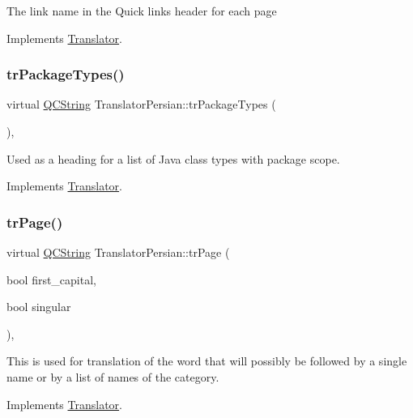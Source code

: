 The link name in the Quick links header for each page 

Implements \mbox{\hyperlink{class_translator}{Translator}}.

\mbox{\label{class_translator_persian_aa18da5cd0eb093b95704b059f8d9cad8}} 
\subsubsection{\texorpdfstring{trPackageTypes()}{trPackageTypes()}}
{\footnotesize\ttfamily virtual \mbox{\hyperlink{class_q_c_string}{Q\+C\+String}} Translator\+Persian\+::tr\+Package\+Types (\begin{DoxyParamCaption}{ }\end{DoxyParamCaption})\hspace{0.3cm}{\ttfamily [inline]}, {\ttfamily [virtual]}}

Used as a heading for a list of Java class types with package scope. 

Implements \mbox{\hyperlink{class_translator}{Translator}}.

\mbox{\label{class_translator_persian_a0fce47b79f4f038344490bf3fe82e684}} 
\subsubsection{\texorpdfstring{trPage()}{trPage()}}
{\footnotesize\ttfamily virtual \mbox{\hyperlink{class_q_c_string}{Q\+C\+String}} Translator\+Persian\+::tr\+Page (\begin{DoxyParamCaption}\item[{bool}]{first\+\_\+capital,  }\item[{bool}]{singular }\end{DoxyParamCaption})\hspace{0.3cm}{\ttfamily [inline]}, {\ttfamily [virtual]}}

This is used for translation of the word that will possibly be followed by a single name or by a list of names of the category. 

Implements \mbox{\hyperlink{class_translator}{Translator}}.

